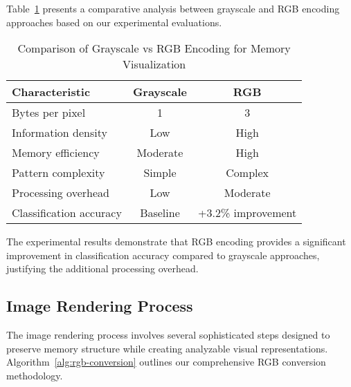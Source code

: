 Table~\ref{tab:encoding-comparison} presents a comparative analysis between grayscale and RGB encoding approaches based on our experimental evaluations.

\begin{table}[!htbp]
    \centering
    \caption{Comparison of Grayscale vs RGB Encoding for Memory Visualization}
    \label{tab:encoding-comparison}
    \begin{tabular}{|l|c|c|}
    \hline
    \textbf{Characteristic} & \textbf{Grayscale} & \textbf{RGB} \\
    \hline
    Bytes per pixel & 1 & 3 \\
    Information density & Low & High \\
    Memory efficiency & Moderate & High \\
    Pattern complexity & Simple & Complex \\
    Processing overhead & Low & Moderate \\
    Classification accuracy & Baseline & +3.2\% improvement \\
    \hline
    \end{tabular}
\end{table}

The experimental results demonstrate that RGB encoding provides a significant improvement in classification accuracy compared to grayscale approaches, justifying the additional processing overhead.

\subsection{Image Rendering Process}
\label{subsec:rendering-process}

The image rendering process involves several sophisticated steps designed to preserve memory structure while creating analyzable visual representations. Algorithm~\ref{alg:rgb-conversion} outlines our comprehensive RGB conversion methodology.

